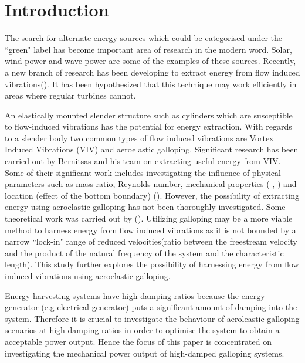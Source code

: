 \section{Introduction} 

The search for alternate energy sources which could be categorised  under the ``green" label has become important area of research in the modern word. Solar, wind power and wave power are some of the examples of these sources.  Recently, a new branch of research has been developing to extract energy from flow induced vibrations(\cite{Bernitsas2008a-concept}). It has been hypothesized that this technique may work efficiently in areas where regular turbines cannot. 

An elastically mounted slender structure such as cylinders which  are susceptible to flow-induced vibrations has the potential for energy extraction. With regards to a slender body two common types of   flow induced vibrations are Vortex Induced Vibrations (VIV) and aeroelastic galloping. Significant research has been carried out by Bernitsas and his team on extracting useful energy from VIV. Some of their significant work includes investigating the influence  of physical parameters such as mass ratio, Reynolds number, mechanical properties (\cite{Raghavan2010a} , \cite{Lee2011b}) and location (effect of the bottom boundary) (\cite{Raghavan2009}). However, the possibility of extracting energy using aeroelastic galloping has not been thoroughly investigated. Some theoretical work was carried out by (\cite{Barrero-Gil2010a}). Utilizing galloping may be a more viable method to harness energy from flow induced vibrations as it is not bounded by a narrow ``lock-in" range of reduced velocities(ratio between the freestream velocity and the product of the natural frequency of the system and the characteristic length). This study further explores the possibility of harnessing energy from flow induced vibrations using aeroelastic galloping.

Energy harvesting systems have high damping ratios because the energy generator (e.g electrical generator) puts a significant amount of damping into the system. Therefore it is crucial to investigate  the behaviour of aeroleastic galloping scenarios at high damping ratios in order to optimise the system to obtain a acceptable power output. Hence the focus of this paper is concentrated on investigating the mechanical power output of high-damped galloping systems.

